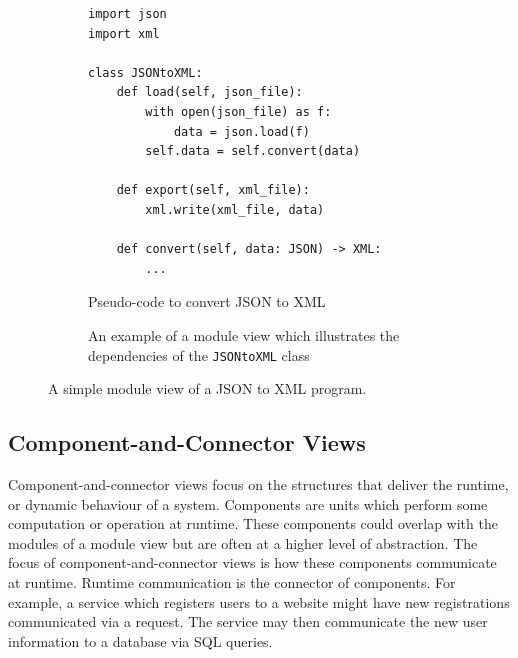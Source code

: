\begin{figure}[ht]
\centering
\begin{subfigure}[b]{\textwidth}
\begin{shaded}
\begin{lstlisting}[style=python]
import json
import xml

class JSONtoXML:
    def load(self, json_file):
        with open(json_file) as f:
            data = json.load(f)
        self.data = self.convert(data)

    def export(self, xml_file):
        xml.write(xml_file, data)

    def convert(self, data: JSON) -> XML:
        ...
\end{lstlisting}
\end{shaded}
\caption{Pseudo-code to convert JSON to XML}
\end{subfigure}


\begin{subfigure}[b]{\textwidth}
\begin{center}
\end{center}
\caption{An example of a module view which illustrates the dependencies of the \texttt{JSONtoXML} class}
\end{subfigure}
\caption{A simple module view of a JSON to XML program.}
\end{figure}

\subsection{Component-and-Connector Views}
Component-and-connector views focus on the structures that deliver the runtime, or dynamic behaviour of a system.
Components are units which perform some computation or operation at runtime.
These components could overlap with the modules of a module view but are often at a higher level of abstraction.
The focus of component-and-connector views is how these components communicate at runtime.
Runtime communication is the connector of components.
For example, a service which registers users to a website might have new registrations communicated via a  request.
The service may then communicate the new user information to a database via SQL queries.

